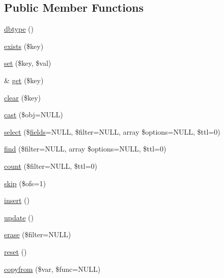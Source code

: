 \subsection*{Public Member Functions}
\begin{DoxyCompactItemize}
\item 
\hyperlink{class_d_b_1_1_mongo_1_1_mapper_a38948c2fb1711f49b72f123cbd91e611}{dbtype} ()
\item 
\hyperlink{class_d_b_1_1_mongo_1_1_mapper_ace1ae5be37bf26c172cc7ea4e1a65e26}{exists} (\$key)
\item 
\hyperlink{class_d_b_1_1_mongo_1_1_mapper_ac8d8012023e560c81f55a629022cb65a}{set} (\$key, \$val)
\item 
\& \hyperlink{class_d_b_1_1_mongo_1_1_mapper_ac3695923790b06917410e205068b8376}{get} (\$key)
\item 
\hyperlink{class_d_b_1_1_mongo_1_1_mapper_a10a949ef75de6c82c98ac555f371ba83}{clear} (\$key)
\item 
\hyperlink{class_d_b_1_1_mongo_1_1_mapper_aa33294a722f17e6e4946223bb73f13ab}{cast} (\$obj=N\+U\+LL)
\item 
\hyperlink{class_d_b_1_1_mongo_1_1_mapper_a57aa9e27404419f6796e017c7251aad4}{select} (\$\hyperlink{class_d_b_1_1_mongo_1_1_mapper_a9dfc1601eaf8348bed6ba5622f725971}{fields}=N\+U\+LL, \$filter=N\+U\+LL, array \$options=N\+U\+LL, \$ttl=0)
\item 
\hyperlink{class_d_b_1_1_mongo_1_1_mapper_a45e70f55799839fc0286bc94000924a7}{find} (\$filter=N\+U\+LL, array \$options=N\+U\+LL, \$ttl=0)
\item 
\hyperlink{class_d_b_1_1_mongo_1_1_mapper_ab1f3a3bd85dca49dceaea57f2fe21abf}{count} (\$filter=N\+U\+LL, \$ttl=0)
\item 
\hyperlink{class_d_b_1_1_mongo_1_1_mapper_aad399d205074eaeed711d5e0157b3c0a}{skip} (\$ofs=1)
\item 
\hyperlink{class_d_b_1_1_mongo_1_1_mapper_a473241246338cfccc4709ba896749019}{insert} ()
\item 
\hyperlink{class_d_b_1_1_mongo_1_1_mapper_a842e4774e3b3601a005b995c02f7e883}{update} ()
\item 
\hyperlink{class_d_b_1_1_mongo_1_1_mapper_aa7210074cfc1eda78dc492d8b8a96616}{erase} (\$filter=N\+U\+LL)
\item 
\hyperlink{class_d_b_1_1_mongo_1_1_mapper_a4a20559544fdf4dcb457e258dc976cf8}{reset} ()
\item 
\hyperlink{class_d_b_1_1_mongo_1_1_mapper_adffe904ab38af888d9b033647ec6d935}{copyfrom} (\$var, \$func=N\+U\+LL)
\item 

\end{DoxyCompactItemize}
